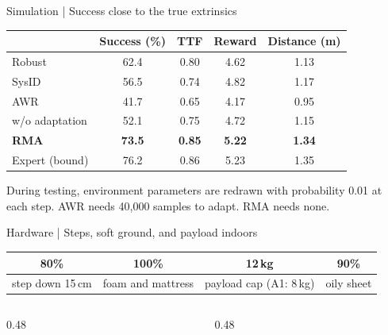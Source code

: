 \documentclass[aspectratio=169,10pt,t]{beamer}
\begin{document}
\begin{frame}{Simulation | Success close to the true extrinsics}
  \vspace{0.2em}
  \centering
  {\footnotesize
  \begin{tabular}{lcccc}
    \toprule
     & Success (\%) & TTF & Reward & Distance (m) \\
    \midrule
    Robust & 62.4 & 0.80 & 4.62 & 1.13 \\
    SysID & 56.5 & 0.74 & 4.82 & 1.17 \\
    AWR & 41.7 & 0.65 & 4.17 & 0.95 \\
    w/o adaptation & 52.1 & 0.75 & 4.72 & 1.15 \\
    \textbf{RMA} & \textbf{73.5} & \textbf{0.85} & \textbf{5.22} & \textbf{1.34} \\
    \midrule
    Expert (bound) & 76.2 & 0.86 & 5.23 & 1.35 \\
    \bottomrule
  \end{tabular}}

  \vspace{0.7em}
  \raggedright
  {\small
  During testing, environment parameters are redrawn with probability 0.01 at each step. AWR needs 40{,}000 samples to adapt. RMA needs none.}

\end{frame}

\begin{frame}{Hardware | Steps, soft ground, and payload indoors}
  \centering
  {\footnotesize
  \begin{tabular}{cccc}
    \toprule
    80\% & 100\% & 12\,kg & 90\% \\
    \midrule
    step down 15\,cm & foam and mattress & payload cap (A1: 8\,kg) & oily sheet \\
    \bottomrule
  \end{tabular}}

  \vspace{1.05em}
  \begin{columns}[T,onlytextwidth]
    \begin{column}{0.48\textwidth}
    \end{column}
    \hfill
    \begin{column}{0.48\textwidth}
    \end{column}
  \end{columns}

\end{frame}
\end{document}
